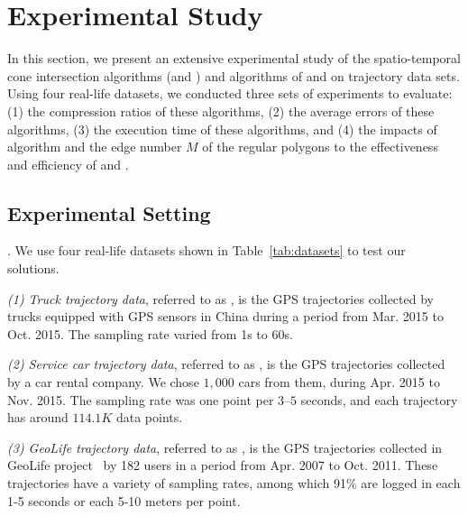 \section{Experimental Study} %
\label{sec-exp}
In this section, we present an extensive experimental study of the spatio-temporal cone intersection algorithms (\cist and \cista) and algorithms of \dpa and \squishe on trajectory data sets.
Using four real-life datasets, we conducted three sets of experiments to evaluate:
(1) the compression ratios of these algorithms,
(2) the average errors of these algorithms,
(3) the execution time of these algorithms, and
(4) the impacts of algorithm \rpia and the edge number $M$ of the regular polygons to the effectiveness and efficiency of \cist and \cista.


\subsection{Experimental Setting}

.
We use four real-life datasets shown in Table~\ref{tab:datasets} to test our solutions.

\eat{
}

\ni \emph{(1) Truck trajectory data}, referred to as \truck, is the GPS trajectories collected by  trucks equipped with GPS sensors in China
during a period from Mar. 2015 to Oct. 2015. The sampling rate varied from 1s to 60s.

\ni \emph{(2) Service car trajectory data}, referred to as \sercar,  is the GPS trajectories collected by a car rental company.
We chose $1,000$ cars from them, during Apr. 2015 to Nov. 2015. The sampling rate was one point per $3$--$5$ seconds, and
each trajectory has around $114.1K$ data points.

\ni \emph{(3) GeoLife trajectory data}, referred to as \geolife, is the GPS trajectories collected in GeoLife project~\cite{Zheng:GeoLife} by 182 users in a period from Apr. 2007 to Oct. 2011. These trajectories have a variety of sampling rates, among which 91\% are logged in each 1-5 seconds or each 5-10 meters per point.

